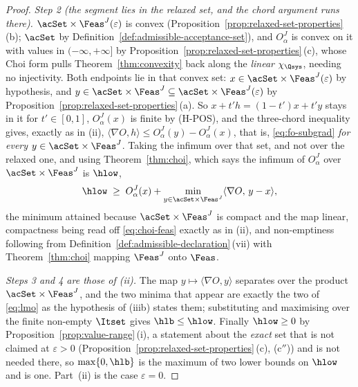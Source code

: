 \begin{proof}
\emph{Step 2 (the segment lies in the relaxed set, and the chord argument
runs there).} $\acSet\times\Feas^{J}(\varepsilon)$ is convex
(Proposition~\ref{prop:relaxed-set-properties}\,(b); $\acSet$ by
Definition~\ref{def:admissible-acceptance-set}), and $O^{J}_{\alpha}$ is convex on it with
values in $(-\infty,+\infty]$ by
Proposition~\ref{prop:relaxed-set-properties}\,(c), whose Choi form pulls
Theorem~\ref{thm:convexity} back along the \emph{linear} $\chi_{\Qsys}$,
needing no injectivity. Both endpoints lie in that convex set:
$x\in\acSet\times\Feas^{J}(\varepsilon)$ by hypothesis, and
$y\in\acSet\times\Feas^{J}\subseteq\acSet\times\Feas^{J}(\varepsilon)$ by
Proposition~\ref{prop:relaxed-set-properties}\,(a). So $x+t'h=(1-t')x+t'y$
stays in it for $t'\in[0,1]$, $O^{J}_{\alpha}(x)$ is finite by (H-POS),
and the three-chord inequality gives, exactly as in (ii),
$\langle\nabla O,h\rangle\le O^{J}_{\alpha}(y)-O^{J}_{\alpha}(x)$, that
is, \eqref{eq:fo-subgrad} \emph{for every $y\in\acSet\times\Feas^{J}$}.
Taking the infimum over that set, and not over the relaxed one, and using
Theorem~\ref{thm:choi}, which says the infimum of $O^{J}_{\alpha}$ over
$\acSet\times\Feas^{J}$ is $\hlow$,
\begin{equation}\label{eq:fo-inf-hybrid}
  \hlow\;\ge\;O^{J}_{\alpha}(x)
  +\min_{y\in\acSet\times\Feas^{J}}\langle\nabla O,\,y-x\rangle ,
\end{equation}
the minimum attained because $\acSet\times\Feas^{J}$ is compact and the
map linear, compactness being read off \eqref{eq:choi-feas} exactly as in
(ii), and non-emptiness following from Definition~\ref{def:admissible-declaration}\,(vii)
with Theorem~\ref{thm:choi} mapping $\Feas^{J}$ onto $\Feas$.

\emph{Steps 3 and 4 are those of (ii).} The map
$y\mapsto\langle\nabla O,y\rangle$ separates over the product
$\acSet\times\Feas^{J}$, and the two minima that appear are exactly the
two of \eqref{eq:lmo} as the hypothesis of (iiib) states them; substituting
and maximising over the finite non-empty $\Itset$ gives $\hlb\le\hlow$.
Finally $\hlow\ge0$ by Proposition~\ref{prop:value-range}\,(i), a
statement about the \emph{exact} set that is not claimed at
$\varepsilon>0$ (Proposition~\ref{prop:relaxed-set-properties}\,(c),
(c$''$)) and is not needed there, so $\max\{0,\hlb\}$ is the maximum of
two lower bounds on $\hlow$ and is one. Part~(ii) is the case
$\varepsilon=0$.


\end{proof}
